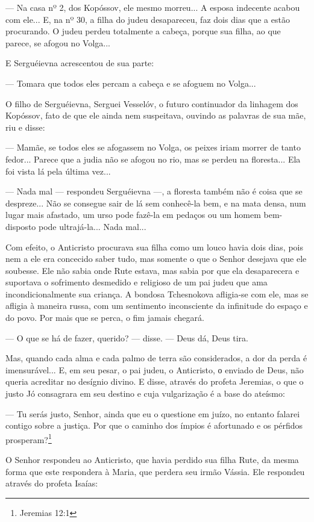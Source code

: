 --- Na casa nº 2, dos Kopóssov, ele mesmo morreu... A esposa indecente
acabou com ele... E, na nº 30, a filha do judeu desapareceu, faz dois
dias que a estão procurando. O judeu perdeu totalmente a cabeça, porque
sua filha, ao que parece, se afogou no Volga...

E Serguéievna acrescentou de sua parte:

--- Tomara que todos eles percam a cabeça e se afoguem no Volga...

O filho de Serguéievna, Serguei Vesselóv, o futuro continuador da
linhagem dos Kopóssov, fato de que ele ainda nem suspeitava, ouvindo as
palavras de sua mãe, riu e disse:

--- Mamãe, se todos eles se afogassem no Volga, os peixes iriam morrer
de tanto fedor... Parece que a judia não se afogou no rio, mas se perdeu
na floresta... Ela foi vista lá pela última vez...

--- Nada mal --- respondeu Serguéievna ---, a floresta também não é
coisa que se despreze... Não se consegue sair de lá sem conhecê-la bem,
e na mata densa, num lugar mais afastado, um urso pode fazê-la em
pedaços ou um homem bem-disposto pode ultrajá-la... Nada mal...

Com efeito, o Anticristo procurava sua filha como um louco havia dois
dias, pois nem a ele era concecido saber tudo, mas somente o que o
Senhor desejava que ele soubesse. Ele não sabia onde Rute estava, mas
sabia por que ela desaparecera e suportava o sofrimento desmedido e
religioso de um pai judeu que ama incondicionalmente sua criança. A
bondosa Tchesnokova afligia-se com ele, mas se afligia à maneira russa,
com um sentimento inconsciente da infinitude do espaço e do povo. Por
mais que se perca, o fim jamais chegará.

--- O que se há de fazer, querido? --- disse. --- Deus dá, Deus tira.

Mas, quando cada alma e cada palmo de terra são considerados, a dor da
perda é imensurável... E, em seu pesar, o pai judeu, o Anticristo, о
enviado de Deus, não queria acreditar no desígnio divino. E disse,
através do profeta Jeremias, o que o justo Jó consagrara em seu destino
e cuja vulgarização é a base do ateísmo:

--- Tu serás justo, Senhor, ainda que eu o questione em juízo, no
entanto falarei contigo sobre a justiça. Por que o caminho dos ímpios é
afortunado e os pérfidos prosperam?\footnote{Jeremias 12:1}

O Senhor respondeu ao Anticristo, que havia perdido sua filha Rute, da
mesma forma que este respondera à Maria, que perdera seu irmão Vássia.
Ele respondeu através do profeta Isaías:

